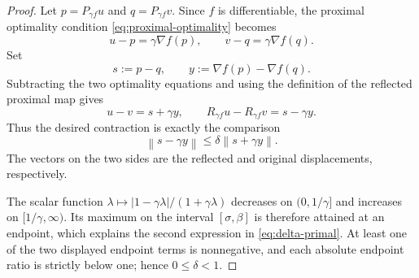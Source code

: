 \documentclass[10pt,leqno]{amsart}
\numberwithin{equation}{section}
\numberwithin{algorithm}{section}
\theoremstyle{remark}
\newcommand{\norm}[1]{\left\lVert #1 \right\rVert}
\newcommand{\grad}{\nabla}
\begin{document}
\begin{proof}
Let
$p=P_{\gamma f}u$ and $q=P_{\gamma f}v$.  Since $f$ is differentiable, the proximal optimality condition \eqref{eq:proximal-optimality} becomes
\[
  u-p=\gamma\grad f(p),
  \qquad
  v-q=\gamma\grad f(q).
\]
Set
\[
  s:=p-q,
  \qquad
  y:=\grad f(p)-\grad f(q).
\]
Subtracting the two optimality equations and using the definition of the reflected proximal map gives
\begin{equation}
\label{eq:u-v-s-y}
  u-v=s+\gamma y,
  \qquad
  R_{\gamma f}u-R_{\gamma f}v=s-\gamma y.
\end{equation}
Thus the desired contraction is exactly the comparison
\begin{equation}
\label{eq:ratio-target}
  \norm{s-\gamma y}
  \le\delta\norm{s+\gamma y}.
\end{equation}
The vectors on the two sides are the reflected and original displacements, respectively.

The scalar function
$\lambda\mapsto |1-\gamma\lambda|/(1+\gamma\lambda)$ decreases on
$(0,1/\gamma]$ and increases on $[1/\gamma,\infty)$.  Its maximum on the interval $[\sigma,\beta]$ is therefore attained at an endpoint, which explains the second expression in \eqref{eq:delta-primal}.  At least one of the two displayed endpoint terms is nonnegative, and each absolute endpoint ratio is strictly below one; hence $0\le\delta<1$.


\end{proof}
\end{document}

